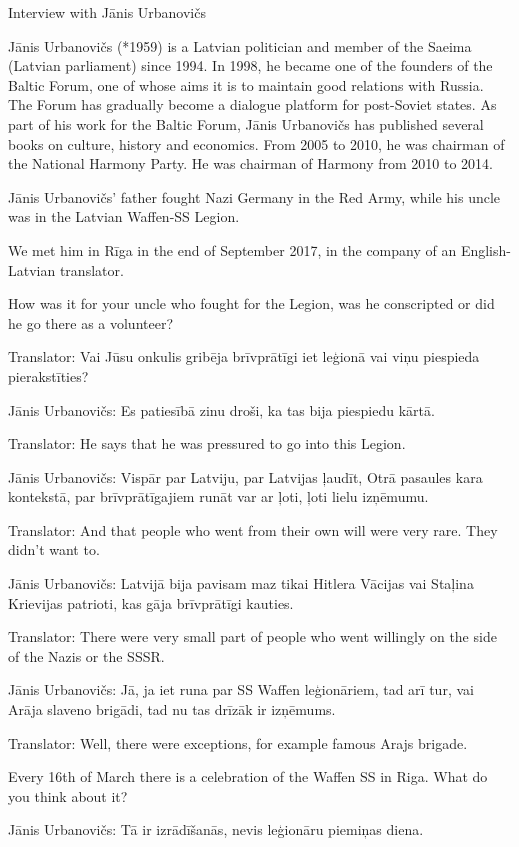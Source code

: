 Interview with Jānis Urbanovičs 

Jānis Urbanovičs (*1959) is a Latvian politician and member of the Saeima (Latvian parliament) since 1994. In 1998, he became one of the founders of the Baltic Forum, one of whose aims it is to maintain good relations with Russia. The Forum has gradually become a dialogue platform for post-Soviet states. As part of his work for the Baltic Forum, Jānis Urbanovičs has published several books on culture, history and economics. From 2005 to 2010, he was chairman of the National Harmony Party. He was chairman of Harmony from 2010 to 2014. 

Jānis Urbanovičs’ father fought Nazi Germany in the Red Army, while his uncle was in the Latvian Waffen-SS Legion.  

We met him in Rīga in the end of September 2017, in the company of an English-Latvian translator. 

How was it for your uncle who fought for the Legion, was he conscripted or did he go there as a volunteer? 

Translator: Vai Jūsu onkulis gribēja brīvprātīgi iet leģionā vai viņu piespieda pierakstīties?  

Jānis Urbanovičs: Es patiesībā zinu droši, ka tas bija piespiedu kārtā. 

Translator: He says that he was pressured to go into this Legion. 

Jānis Urbanovičs: Vispār par Latviju, par Latvijas ļaudīt, Otrā pasaules kara kontekstā, par brīvprātīgajiem runāt var ar ļoti, ļoti lielu izņēmumu.  

Translator: And that people who went from their own will were very rare. They didn’t want to. 

Jānis Urbanovičs: Latvijā bija pavisam maz tikai Hitlera Vācijas vai Staļina Krievijas patrioti, kas gāja brīvprātīgi kauties. 

Translator: There were very small part of people who went willingly on the side of the Nazis or the SSSR. 

Jānis Urbanovičs: Jā, ja iet runa par SS Waffen leģionāriem, tad arī tur, vai Arāja slaveno brigādi, tad nu tas drīzāk ir izņēmums. 

Translator: Well, there were exceptions, for example famous Arajs brigade. 

Every 16th of March there is a celebration of the Waffen SS in Riga. What do you think about it? 

Jānis Urbanovičs: Tā ir izrādīšanās, nevis leģionāru piemiņas diena. 

